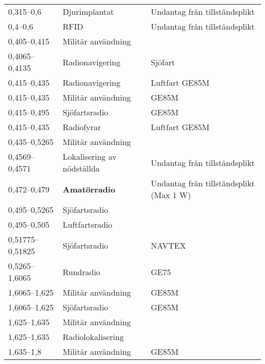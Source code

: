 \begin{landscape}
\begin{longtable}{lll}
0,315--0,6	 & Djurimplantat                   & Undantag från tillståndsplikt             \\
0,4--0,6	 & RFID                            & Undantag från tillståndsplikt             \\
0,405--0,415	 & Militär användning              &                                           \\	 
0,4065--0,4135	 & Radionavigering                 & Sjöfart                                   \\
0,415--0,435	 & Radionavigering                 & Luftfart GE85M                            \\
0,415--0,435	 & Militär användning              & GE85M                                     \\
0,415--0,495	 & Sjöfartsradio                   & GE85M                                     \\
0,415--0,435	 & Radiofyrar                      & Luftfart	GE85M                          \\
0,435--0,5265	 & Militär användning              &                                           \\ 
0,4569--0,4571	 & Lokalisering av nödställda      & Undantag från tillståndsplikt             \\
0,472--0,479	 & \textbf{Amatörradio}            & Undantag från tillståndsplikt (Max 1 W)   \\
0,495--0,5265	 & Sjöfartsradio                   &                                           \\
0,495--0,505	 & Luftfartsradio                  &                                           \\
0,51775--0,51825 & Sjöfartsradio                   & NAVTEX                                    \\
0,5265--1,6065	 & Rundradio                       & GE75                                      \\
1,6065--1,625	 & Militär användning              & GE85M                                     \\
1,6065--1,625	 & Sjöfartsradio                   & GE85M                                     \\
1,625--1,635	 & Militär användning              &                                           \\
1,625--1,635	 & Radiolokalisering               &                                           \\
1,635--1,8	 & Militär användning              & GE85M                                     \\

\end{longtable}
\end{landscape}
